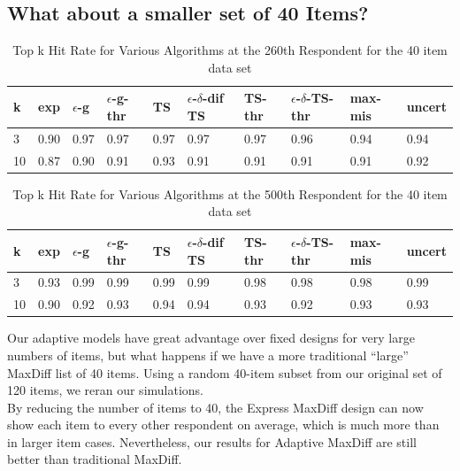 \documentclass[nonblindrev]{informs3}
\newcommand{\fixedexpressS}{\textbf{exp}}
\newcommand{\egreedyS}{$\epsilon$-\textbf{g}}
\newcommand{\egreedythresS}{$\epsilon$-\textbf{g-thr}}
\newcommand{\misminS}{\textbf{max-mis}}
\newcommand{\tsS}{\textbf{TS} }
\newcommand{\edtsS}{$\epsilon$-$\delta$-\textbf{dif TS} }
\newcommand{\tsthresS}{\textbf{TS-thr} }
\newcommand{\edtsthresS}{$\epsilon$-$\delta$-\textbf{TS-thr} }
\newcommand{\uncertS}{\textbf{uncert} }
\begin{document}
\subsection{What about a smaller set of 40 Items?}
\begin{table}
\begin{center}
\begin{tabular}{llllllllll}
\hline   k &  \fixedexpressS & \egreedyS&\egreedythresS&\tsS&\edtsS&\tsthresS&\edtsthresS& \misminS& \uncertS  \\ \hline  3 & 0.90 & 0.97 &  0.97 &  0.97 & 0.97 & 0.97 &  0.96 & 0.94 &  0.94 \\  10 & 0.87 & 0.90 & 0.91 &  0.93 & 0.91 & 0.91 & 0.91 & 0.91 &  0.92  \end{tabular}
\end{center}
\caption{Top k Hit Rate for Various Algorithms at the 260th Respondent for the 40 item data set}
\label{table:40at260}
\end{table}

\begin{table}
\begin{center}
\begin{tabular}{llllllllll}
\hline   k &  \fixedexpressS & \egreedyS&\egreedythresS&\tsS&\edtsS&\tsthresS&\edtsthresS& \misminS& \uncertS \\ \hline    
3 & 0.93 & 0.99 & 0.99 & 0.99 & 0.99 & 0.98 & 0.98 & 0.98 &  0.99 \\  10 & 0.90 &   0.92 &  0.93  & 0.94 & 0.94 & 0.93 &    0.92 & 0.93 &  0.93 \end{tabular}
\end{center}
\caption{Top k Hit Rate for Various Algorithms at the 500th Respondent for the 40 item data set}
\label{table:40at500}
\end{table}
Our adaptive models have great advantage over fixed designs for very large numbers of items, but what happens if we have a more traditional ``large'' MaxDiff list of 40 items. Using a random 40-item subset from our original set of 120 items, we reran our simulations. \\
By reducing the number of items to 40, the Express MaxDiff design can now show each item to every other respondent on average, which is much more than in larger item cases.
Nevertheless, our results for Adaptive MaxDiff are still better than traditional MaxDiff.
\end{document}

